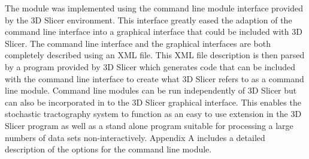 The module was implemented using the command line module interface provided by the 3D Slicer environment.  This interface greatly eased the adaption of the command line interface into a graphical interface that could be included with 3D Slicer.  The command line interface and the graphical interfaces are both completely described using an XML file.  This XML file description is then parsed by a program provided by 3D Slicer which generates code that can be included with the command line interface to create what 3D Slicer refers to as a command line module.  Command line modules can be run independently of 3D Slicer but can also be incorporated in to the 3D Slicer graphical interface.  This enables the stochastic tractography system to function as an easy to use extension in the 3D Slicer program as well as a stand alone program suitable for processing a large numbers of data sets non-interactively.  Appendix A includes a detailed description of the options for the command line module.


